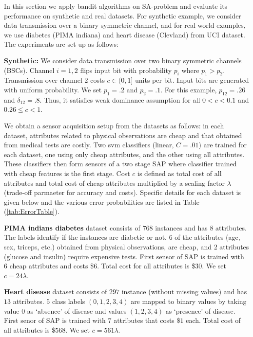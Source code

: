 In this section we apply bandit algorithms on SA-problem and evaluate its performance on synthetic and real datasets. For synthetic example, we consider data transmission over a binary symmetric channel, and for real world examples, we use diabetes (PIMA indiana) and heart disease (Clevland) from UCI dataset. The experiments are set up as follows:

{\bf Synthetic:} We consider data transmission over two binary symmetric channels (BSCs). Channel $i=1,2$ flips input bit with probability $p_i$ where $p_1> p_2$. Transmission over channel $2$ costs $ c \in (0,1] $ units per bit. Input bits are generated with uniform probability. We set $p_1=.2$ and $p_2=.1$. For this example, $p_{12}=.26$ and $\delta_{12}=.8$. Thus, it satisfies weak dominance assumption for all $ 0<c <0 .1$ and $0 .26 \leq c < 1$.

We obtain a sensor acquisition setup from the datasets as follows: in each dataset, attributes related to physical observations are cheap and that obtained from medical tests are costly. Two svm classifiers (linear, $C=.01$) are trained for each dataset, one using only cheap attributes, and the other using all attributes. These classifiers then form sensors of a two stage SAP where classifier trained with cheap features is the first stage. Cost $c$ is defined as total cost of all attributes and total cost of cheap attributes multiplied by a scaling factor $\lambda$ (trade-off parmaeter for accuracy and costs). Specific details for each dataset is given below and the various error probabilities are listed in Table (\ref{tab:ErrorTable}).    

{\bf PIMA indians diabetes} dataset consists of $768$ instances and has $8$ attributes. The labels identify if the instances are diabetic or not. $6$ of the attributes (age, sex, triceps, etc.) obtained from physical observations, are cheap, and $2$ attributes (glucose and insulin) require expensive tests. First sensor of SAP is trained with $6$ cheap attributes and costs \$$6$. Total cost for all attributes is \$$30$. We set $c= 24\lambda$.

{\bf Heart disease} dataset consists of $297$ instance (without missing values) and has $13$ attributes. $5$ class labels $(0,1,2,3,4)$ are mapped to binary values by taking value $0$ as `absence' of disease and values $(1,2,3,4)$ as `presence' of disease. First senor of SAP is trained with $7$ attributes that costs  \$$1$ each. Total cost of all attributes is \$$568$. We set $c= 561\lambda$.


